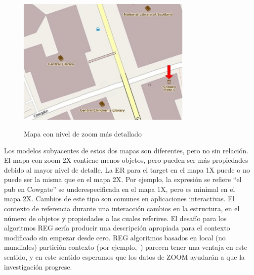 \begin{figure}[ht]
\begin{center}
\includegraphics[width=8.5cm]{figures/with-zoom.jpg}\\[0pt]
\caption{Mapa con nivel de zoom m\'as detallado}
\label{fig-with-zoom}
\end{center}
\end{figure}


 Los modelos subyacentes de estos dos mapas son diferentes, pero no sin relaci\'on. El mapa con zoom 2X contiene menos objetos, pero pueden ser m\'as propiedades debido al mayor nivel de detalle. La ER para el target en el mapa 1X puede o no puede ser la misma que en el mapa 2X. Por ejemplo, la expresi\'on se refiere ``el pub en Cowgate'' se underespecificada en el mapa 1X, pero es minimal en el mapa 2X. Cambios de este tipo son comunes en aplicaciones interactivas. El contexto de referencia durante una interacci\'on cambios en la estructura, en el n\'umero de objetos y propiedades a las cuales referirse. El desaf\'{i}o para los algoritmos REG ser\'{i}a producir una descripci\'on apropiada para el contexto modificado sin empezar desde cero. REG algoritmos basados en local (no mundiales) partici\'on contexto (por ejemplo,~\cite{areces08}) parecen tener una ventaja en este sentido, y en este sentido esperamos que los datos de ZOOM ayudar\'an a que la investigaci\'on progrese.


